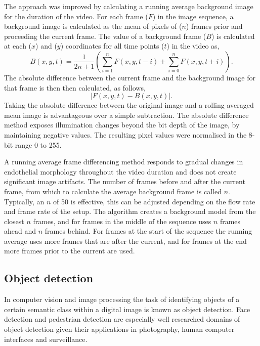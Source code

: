 The approach was improved by calculating a running average background image for the duration of the video. For each frame ($F$) in the image sequence, a background image is calculated as the mean of pixels of ($n$) frames prior and proceeding the current frame. The value of a background frame ($B$) is calculated at each ($x$) and ($y$) coordinates for all time points ($t$) in the video as,
\begin{equation}
B(x,y,t) = \frac{1}{2n+1}\left(\sum_{i=1}^{n} F(x,y,t-i) + \sum_{i=0}^{n} F(x,y,t+i)\right).
\end{equation}
The absolute difference between the current frame and the background image for that frame is then then calculated, as follows,
\begin{equation}
\left|F(x,y,t) - B(x,y,t)\right|.
\end{equation}
Taking the absolute difference between the original image and a rolling averaged mean image is advantageous over a simple subtraction. The absolute difference method exposes illumination changes beyond the bit depth of the image, by maintaining negative values. The resulting pixel values were normalised in the 8-bit range 0 to 255.

A running average frame differencing method responds to gradual changes in endothelial morphology throughout the video duration and does not create significant image artifacts. The number of frames before and after the current frame, from which to calculate the average background frame is called $n$. Typically, an $n$ of 50 is effective, this can be adjusted depending on the flow rate and frame rate of the setup. The algorithm creates a background model from the closest $n$ frames, and for frames in the middle of the sequence uses $n$ frames ahead and $n$ frames behind. For frames at the start of the sequence the running average uses more frames that are after the current, and for frames at the end more frames prior to the current are used.

\subsection{Object detection}
\label{leukocytes:processing:detection}
In computer vision and image processing the task of identifying objects of a certain semantic class within a digital image is known as object detection. Face detection and pedestrian detection are especially well researched domains of object detection given their applications in photography, human computer interfaces and surveillance.

